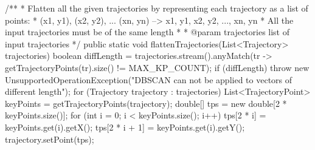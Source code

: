 /**
 * Flatten all the given trajectories by representing each trajectory as a list of points:
 * {(x1, y1), (x2, y2), ... (xn, yn)} --> {x1, y1, x2, y2, ..., xn, yn}
 * All the input trajectories must be of the same length
 *
 * @param trajectories 		list of input trajectories
 */
public static void flattenTrajectories(List<Trajectory> trajectories) {
    boolean diffLength = trajectories.stream().anyMatch(tr -> getTrajectoryPoints(tr).size() != MAX_KP_COUNT);
    if (diffLength) {
        throw new UnsupportedOperationException("DBSCAN can not be applied to vectors of different length");
    }
    for (Trajectory trajectory : trajectories) {
        List<TrajectoryPoint> keyPoints = getTrajectoryPoints(trajectory);
        double[] tps = new double[2 * keyPoints.size()];
        for (int i = 0; i < keyPoints.size(); i++) {
            tps[2 * i] = keyPoints.get(i).getX();
            tps[2 * i + 1] = keyPoints.get(i).getY();
        }
        trajectory.setPoint(tps);
    }
}